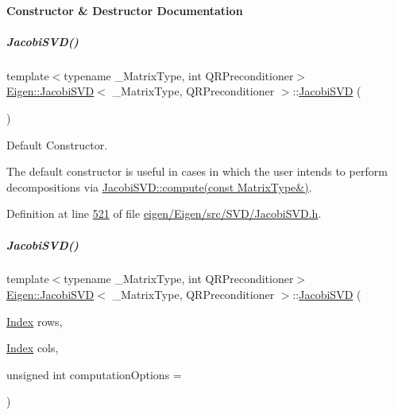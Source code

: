 \paragraph{Constructor \& Destructor Documentation}
\mbox{\label{group___s_v_d___module_a55315ab9cd060019a5ad07be798ff3b9}} 
\subparagraph{\texorpdfstring{Jacobi\+S\+V\+D()}{JacobiSVD()}\hspace{0.1cm}{\footnotesize\ttfamily [1/6]}}
{\footnotesize\ttfamily template$<$typename \+\_\+\+Matrix\+Type, int Q\+R\+Preconditioner$>$ \\
\hyperlink{group___s_v_d___module_class_eigen_1_1_jacobi_s_v_d}{Eigen\+::\+Jacobi\+S\+VD}$<$ \+\_\+\+Matrix\+Type, Q\+R\+Preconditioner $>$\+::\hyperlink{group___s_v_d___module_class_eigen_1_1_jacobi_s_v_d}{Jacobi\+S\+VD} (\begin{DoxyParamCaption}{ }\end{DoxyParamCaption})\hspace{0.3cm}{\ttfamily [inline]}}



Default Constructor. 

The default constructor is useful in cases in which the user intends to perform decompositions via \hyperlink{group___s_v_d___module_acc7b9a4068cf7b69ae3227d217ed7efd}{Jacobi\+S\+V\+D\+::compute(const Matrix\+Type\&)}. 

Definition at line \hyperlink{eigen_2_eigen_2src_2_s_v_d_2_jacobi_s_v_d_8h_source_l00521}{521} of file \hyperlink{eigen_2_eigen_2src_2_s_v_d_2_jacobi_s_v_d_8h_source}{eigen/\+Eigen/src/\+S\+V\+D/\+Jacobi\+S\+V\+D.\+h}.

\mbox{\label{group___s_v_d___module_a5d9ea7c8f361337727260efd77ee03ac}} 
\subparagraph{\texorpdfstring{Jacobi\+S\+V\+D()}{JacobiSVD()}\hspace{0.1cm}{\footnotesize\ttfamily [2/6]}}
{\footnotesize\ttfamily template$<$typename \+\_\+\+Matrix\+Type, int Q\+R\+Preconditioner$>$ \\
\hyperlink{group___s_v_d___module_class_eigen_1_1_jacobi_s_v_d}{Eigen\+::\+Jacobi\+S\+VD}$<$ \+\_\+\+Matrix\+Type, Q\+R\+Preconditioner $>$\+::\hyperlink{group___s_v_d___module_class_eigen_1_1_jacobi_s_v_d}{Jacobi\+S\+VD} (\begin{DoxyParamCaption}\item[{\hyperlink{group___s_v_d___module_a6229a37997eca1072b52cca5ee7a2bec}{Index}}]{rows,  }\item[{\hyperlink{group___s_v_d___module_a6229a37997eca1072b52cca5ee7a2bec}{Index}}]{cols,  }\item[{unsigned int}]{computation\+Options = {} }\end{DoxyParamCaption})\hspace{0.3cm}{\ttfamily [inline]}}



